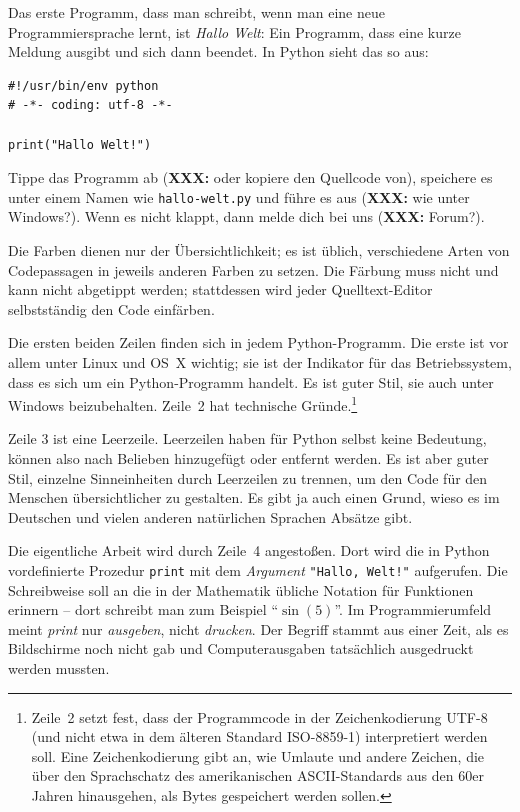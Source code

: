 \documentclass{blatt}
\newcommand{\XXX}[1]{\textbf{XXX:} #1}
\begin{document}
Das erste Programm, dass man schreibt, wenn man eine neue Programmiersprache
lernt, ist \emph{Hallo Welt}: Ein Programm, dass eine kurze Meldung ausgibt
und sich dann beendet. In Python sieht das so aus:

\begin{verbatim}
#!/usr/bin/env python
# -*- coding: utf-8 -*-

print("Hallo Welt!")
\end{verbatim}

Tippe das Programm ab (\XXX{oder kopiere den Quellcode von}), speichere es unter
einem Namen wie \texttt{hallo-welt.py} und führe es aus (\XXX{wie unter Windows?}).
Wenn es nicht klappt, dann melde dich bei uns (\XXX{Forum?}).

Die Farben dienen nur der Übersichtlichkeit; es ist üblich, verschiedene Arten
von Codepassagen in jeweils anderen Farben zu setzen. Die Färbung muss nicht
und kann nicht abgetippt werden; stattdessen wird jeder Quelltext-Editor
selbstständig den Code einfärben.

Die ersten beiden Zeilen finden sich in jedem Python-Programm. Die erste ist
vor allem unter Linux und OS~X wichtig; sie ist der Indikator für das
Betriebssystem, dass es sich um ein Python-Programm handelt. Es ist guter Stil,
sie auch unter Windows beizubehalten. Zeile~2 hat technische
Gründe.\footnote{Zeile~2 setzt fest, dass der Programmcode in der
Zeichenkodierung UTF-8 (und nicht etwa in dem älteren Standard ISO-8859-1)
interpretiert werden soll. Eine Zeichenkodierung gibt an, wie Umlaute und
andere Zeichen, die über den Sprachschatz des amerikanischen ASCII-Standards
aus den 60er Jahren hinausgehen, als Bytes gespeichert werden sollen.}

Zeile 3 ist eine Leerzeile. Leerzeilen haben für Python selbst keine Bedeutung,
können also nach Belieben hinzugefügt oder entfernt werden. Es ist aber guter
Stil, einzelne Sinneinheiten durch Leerzeilen zu trennen, um den Code für den
Menschen übersichtlicher zu gestalten. Es gibt ja auch einen Grund, wieso es im
Deutschen und vielen anderen natürlichen Sprachen Absätze gibt.

Die eigentliche Arbeit wird durch Zeile~4 angestoßen. Dort wird die in Python
vordefinierte Prozedur \texttt{print} mit dem \emph{Argument}
\texttt{"Hallo, Welt!"} aufgerufen. Die Schreibweise soll an die in der Mathematik übliche
Notation für Funktionen erinnern -- dort schreibt man zum Beispiel
"`$\sin(5)$"'. Im Programmierumfeld meint \emph{print} nur \emph{ausgeben},
nicht \emph{drucken}. Der Begriff stammt aus einer Zeit, als es Bildschirme
noch nicht gab und Computerausgaben tatsächlich ausgedruckt werden mussten.
\end{document}
